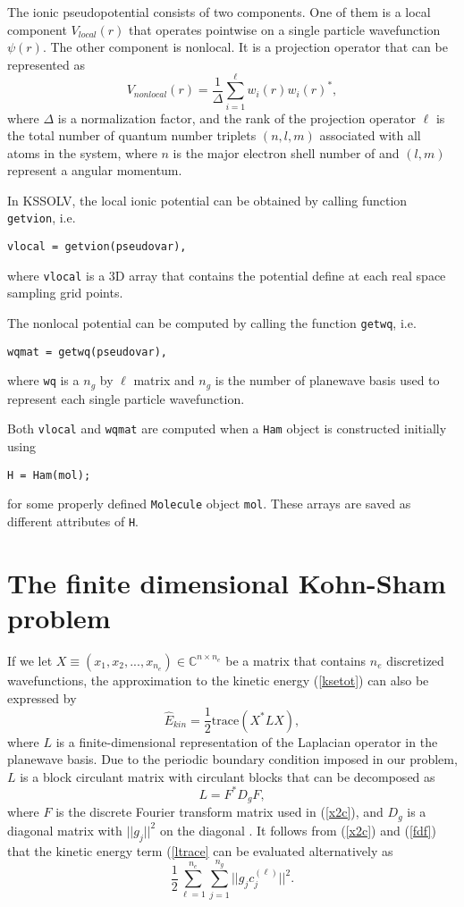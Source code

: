 \documentclass[11pt]{book}
\begin{document}
The ionic pseudopotential consists of two components.  One of them
is a local component $V_{local}(r)$ that operates pointwise on a single
particle wavefunction $\psi(r)$. The other component is nonlocal. It
is a projection operator that can be represented as
\[
V_{nonlocal}(r) = \frac{1}{\Delta}\sum_{i=1}^{\ell} w_i(r) w_i(r)^{\ast},
\]
where $\Delta$ is a normalization factor, and the rank of the 
projection operator $\ell$ is the total number of quantum number
triplets $(n,l,m)$ associated with all atoms in the system, where
$n$ is the major electron shell number of and $(l,m)$ represent a
angular momentum. 

In KSSOLV, the local ionic potential can be obtained by calling
function {\tt getvion}, i.e.
\begin{verbatim}
vlocal = getvion(pseudovar),
\end{verbatim}
where {\tt vlocal} is a 3D array that contains the potential define
at each real space sampling grid points.  

The nonlocal potential can be computed by calling the function
{\tt getwq}, i.e.
\begin{verbatim}
wqmat = getwq(pseudovar),
\end{verbatim}
where {\tt wq} is a $n_g$ by $\ell$ matrix and $n_g$ is the number of
planewave basis used to represent each single particle wavefunction. 

Both {\tt vlocal} and {\tt wqmat} are computed when a {\tt Ham} object
is constructed initially using
\begin{verbatim}
H = Ham(mol);
\end{verbatim}
for some properly defined {\tt Molecule} object {\tt mol}.  These arrays
are saved as different attributes of {\tt H}.

\section{The finite dimensional Kohn-Sham problem}
If we let $X \equiv (x_1, x_2, ..., x_{n_e}) \in \mathbb{C}^{n\times n_e}$
be a matrix that contains $n_e$ discretized wavefunctions, the approximation 
to the kinetic energy (\ref{ksetot}) can also be expressed by
\begin{equation}
\hat{E}_{kin} = \frac{1}{2}\mbox{trace}(X^{\ast} LX),
\label{ltrace}
\end{equation}
where $L$ is a finite-dimensional representation of the Laplacian operator
in the planewave basis.  Due to the periodic boundary condition imposed 
in our problem, $L$ is a block circulant matrix with circulant blocks that 
can be decomposed as
\begin{equation}
L = F^{\ast} D_g F,  \label{fdf}
\end{equation}
where $F$ is the discrete Fourier transform matrix used in (\ref{x2c}),
and $D_g$ is a diagonal matrix with $|| g_j || ^2$ on the diagonal 
\cite{pjdavis}. It follows from (\ref{x2c}) and (\ref{fdf}) that the 
kinetic energy term (\ref{ltrace} can be evaluated alternatively as
\[
\frac{1}{2}\sum_{\ell=1}^{n_e} \sum_{j=1}^{n_g} ||g_{j} c_j^{(\ell)}||^2.
\]
\end{document}
